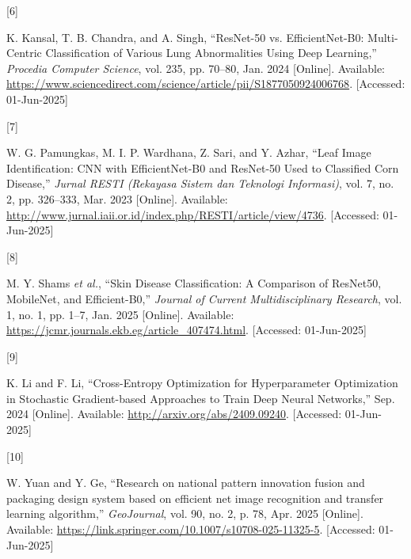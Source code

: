 \documentclass[
  journal,
]{IEEEtran}%
\newlength{\cslhangindent}
\newlength{\csllabelwidth}
\newenvironment{CSLReferences}[2] %
 {\begin{list}{}{%
  \setlength{\itemindent}{0pt}
  \setlength{\leftmargin}{0pt}
  \setlength{\parsep}{0pt}
  \ifodd #1
   \setlength{\leftmargin}{\cslhangindent}
   \setlength{\itemindent}{-1\cslhangindent}
  \fi
  \setlength{\itemsep}{#2\baselineskip}}}
 {\end{list}}
\newcommand{\CSLLeftMargin}[1]{\parbox[t]{\csllabelwidth}{\strut#1\strut}}
\newcommand{\CSLRightInline}[1]{\parbox[t]{\linewidth - \csllabelwidth}{\strut#1\strut}}
\providecommand{\bibfont}{\footnotesize}
\begin{document}
\begin{CSLReferences}{0}{0}
\CSLLeftMargin{{[}6{]} }%
\CSLRightInline{K. Kansal, T. B. Chandra, and A. Singh, {``{ResNet}-50
vs. {EfficientNet}-{B0}: {Multi}-{Centric} {Classification} of {Various}
{Lung} {Abnormalities} {Using} {Deep} {Learning},''} \emph{Procedia
Computer Science}, vol. 235, pp. 70--80, Jan. 2024 {[}Online{]}.
Available:
\url{https://www.sciencedirect.com/science/article/pii/S1877050924006768}.
{[}Accessed: 01-Jun-2025{]}}

\CSLLeftMargin{{[}7{]} }%
\CSLRightInline{W. G. Pamungkas, M. I. P. Wardhana, Z. Sari, and Y.
Azhar, {``Leaf {Image} {Identification}: {CNN} with {EfficientNet}-{B0}
and {ResNet}-50 {Used} to {Classified} {Corn} {Disease},''} \emph{Jurnal
RESTI (Rekayasa Sistem dan Teknologi Informasi)}, vol. 7, no. 2, pp.
326--333, Mar. 2023 {[}Online{]}. Available:
\url{http://www.jurnal.iaii.or.id/index.php/RESTI/article/view/4736}.
{[}Accessed: 01-Jun-2025{]}}

\CSLLeftMargin{{[}8{]} }%
\CSLRightInline{M. Y. Shams \emph{et al.}, {``Skin {Disease}
{Classification}: {A} {Comparison} of {ResNet50}, {MobileNet}, and
{Efficient}-{B0},''} \emph{Journal of Current Multidisciplinary
Research}, vol. 1, no. 1, pp. 1--7, Jan. 2025 {[}Online{]}. Available:
\url{https://jcmr.journals.ekb.eg/article_407474.html}. {[}Accessed:
01-Jun-2025{]}}

\CSLLeftMargin{{[}9{]} }%
\CSLRightInline{K. Li and F. Li, {``Cross-{Entropy} {Optimization} for
{Hyperparameter} {Optimization} in {Stochastic} {Gradient}-based
{Approaches} to {Train} {Deep} {Neural} {Networks},''} Sep. 2024
{[}Online{]}. Available: \url{http://arxiv.org/abs/2409.09240}.
{[}Accessed: 01-Jun-2025{]}}

\CSLLeftMargin{{[}10{]} }%
\CSLRightInline{W. Yuan and Y. Ge, {``Research on national pattern
innovation fusion and packaging design system based on efficient net
image recognition and transfer learning algorithm,''} \emph{GeoJournal},
vol. 90, no. 2, p. 78, Apr. 2025 {[}Online{]}. Available:
\url{https://link.springer.com/10.1007/s10708-025-11325-5}. {[}Accessed:
01-Jun-2025{]}}

\end{CSLReferences}


\ifCLASSOPTIONcaptionsoff
  \newpage
\fi



\pagebreak[3]
\end{document}

